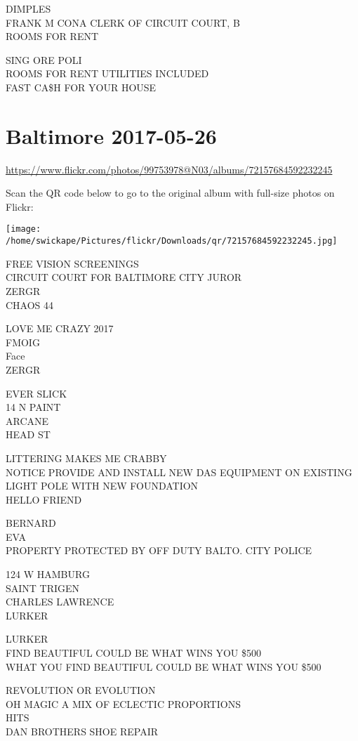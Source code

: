 \documentclass[10pt,letterpaper]{article}
\begin{document}
DIMPLES\\
FRANK M CONA CLERK OF CIRCUIT COURT, B\\
ROOMS FOR RENT

SING ORE POLI\\
ROOMS FOR RENT UTILITIES INCLUDED\\
FAST CA\$H FOR YOUR HOUSE
\pagebreak

\section*{Baltimore 2017-05-26}

\url{https://www.flickr.com/photos/99753978@N03/albums/72157684592232245}

Scan the QR code below to go to the original album with full-size photos on Flickr:

\texttt{[image: /home/swickape/Pictures/flickr/Downloads/qr/72157684592232245.jpg]}
\pagebreak

FREE VISION SCREENINGS\\
CIRCUIT COURT FOR BALTIMORE CITY JUROR\\
ZERGR\\
CHAOS 44

LOVE ME CRAZY 2017\\
FMOIG\\
Face\\
ZERGR

EVER SLICK\\
14 N PAINT\\
ARCANE\\
HEAD ST

LITTERING MAKES ME CRABBY\\
NOTICE PROVIDE AND INSTALL NEW DAS EQUIPMENT ON EXISTING LIGHT POLE WITH NEW FOUNDATION\\
HELLO FRIEND

BERNARD\\
EVA\\
PROPERTY PROTECTED BY OFF DUTY BALTO. CITY POLICE

124 W HAMBURG\\
SAINT TRIGEN\\
CHARLES LAWRENCE\\
LURKER

LURKER\\
FIND BEAUTIFUL COULD BE WHAT WINS YOU \$500\\
WHAT YOU FIND BEAUTIFUL COULD BE WHAT WINS YOU \$500

REVOLUTION OR EVOLUTION\\
OH MAGIC A MIX OF ECLECTIC PROPORTIONS\\
HITS\\
DAN BROTHERS SHOE REPAIR
\end{document}
